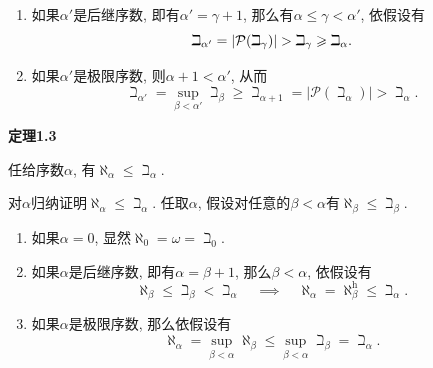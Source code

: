 \documentclass[UTF8]{ctexart}
\begin{document}
\begin{enumerate}
    \item 如果$\alpha'$是后继序数, 即有$\alpha'=\gamma+1$,
    那么有$\alpha\leqslant\gamma<\alpha'$, 依假设有
    \vspace{1pt}
    \[
        \beth_{\alpha'}=|\mathcal{P}(\beth_\gamma)|>
        \beth_\gamma\geqslant\beth_\alpha.\\[3pt]
    \]
    \item 如果$\alpha'$是极限序数, 则$\alpha+1<\alpha'$, 从而
    \vspace{1pt}
    \begin{equation*}
        \beth_{\alpha'}=\sup_{\beta<\alpha'}\beth_\beta
        \geqslant\beth_{\alpha+1}=|\mathcal{P}(\beth_\alpha)|>\beth_\alpha.
    \tag*{\qedsymbol}\end{equation*}
\end{enumerate}

\vspace{10pt}

\hypertarget{sec:定理1.3}{}
\noindent\textbf{定理1.3}

任给序数$\alpha$, 有$\aleph_\alpha\leqslant\beth_\alpha$.


对$\alpha$归纳证明$\aleph_\alpha\leqslant\beth_\alpha$.
任取$\alpha$, 假设对任意的$\beta<\alpha$有$\aleph_\beta\leqslant\beth_\beta$.

\begin{enumerate}
    \item 如果$\alpha=0$, 显然$\aleph_0=\omega=\beth_0$.
    \item 如果$\alpha$是后继序数, 即有$\alpha=\beta+1$,
    那么$\beta<\alpha$, 依假设有
    \[
        \aleph_\beta\leqslant\beth_\beta<\beth_\alpha\quad\implies\quad
        \aleph_\alpha=\aleph_\beta^{\mathrm{h}}\leqslant\beth_\alpha.
    \]
    \item 如果$\alpha$是极限序数, 那么依假设有
    \begin{equation*}
        \aleph_\alpha=\sup_{\beta<\alpha}\aleph_\beta\leqslant
        \sup_{\beta<\alpha}\beth_\beta=\beth_\alpha.
    \tag*{\qedsymbol}\end{equation*}
\end{enumerate}
\end{document}
